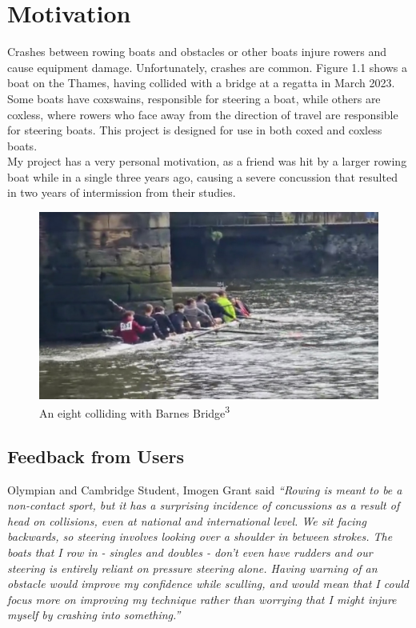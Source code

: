 \documentclass[12pt,a4paper]{report}
\begin{document}
\section{Motivation}	
Crashes between rowing boats and obstacles or other boats injure rowers and cause equipment damage. Unfortunately, crashes are common. Figure 1.1 shows a boat on the Thames, having collided with a bridge at a regatta in March 2023. Some boats have coxswains, responsible for steering a boat, while others are coxless, where rowers who face away from the direction of travel are responsible for steering boats. This project is designed for use in both coxed and coxless boats. \\
My project has a very personal motivation, as a friend was hit by a larger rowing boat while in a single three years ago, causing a severe concussion that resulted in two years of intermission from their studies. \\
\begin{figure}[h]
\begin{center}
\includegraphics[scale=0.5]{boatCrash.jpg.png}
\end{center}
\caption{An eight colliding with Barnes Bridge\textsuperscript{3}}
\end{figure}

\subsection{Feedback from Users}
Olympian and Cambridge Student, Imogen Grant said
\emph{``Rowing is meant to be a non-contact sport, but it has a surprising incidence of concussions as a result of head on collisions, even at national and international level. We sit facing backwards, so steering involves looking over a shoulder in between strokes. The boats that I row in - singles and doubles - don't even have rudders and our steering is entirely reliant on pressure steering alone. Having warning of an obstacle would improve my confidence while sculling, and would mean that I could focus more on improving my technique rather than worrying that I might injure myself by crashing into something.''}
\end{document}
